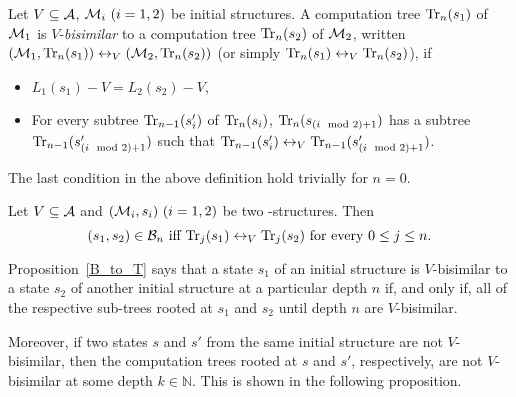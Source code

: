 \documentclass{article}
\begin{document}
Let $V\subseteq\cal A$, ${\cal M}_i~(i=1,2)$ be  initial  structures.
A computation tree $\textrm{Tr}_n(s_1)$ of ${\cal M}_1$ is $V$-{\em bisimilar}
to a computation tree $\textrm{Tr}_n(s_2)$ of ${\cal M}_2$, written
$({\cal M}_1,\textrm{Tr}_n(s_1))\leftrightarrow_V({\cal M}_2,\textrm{Tr}_n(s_2))$ (or simply
$\textrm{Tr}_n(s_1)\leftrightarrow_V\textrm{Tr}_n(s_2)$), if %
\begin{itemize}
  \item $L_1(s_1)- V=L_2(s_2)- V$,
  \item For every subtree $\textrm{Tr}_{n-1}(s_i')$ of $\textrm{Tr}_n(s_i)$,
  $\textrm{Tr}_n(s_{(i \mod 2)+1})$ has a subtree $\textrm{Tr}_{n-1}(s_{(i \mod 2)+1}')$ such that
  $\textrm{Tr}_{n-1}(s_i')\leftrightarrow_V\textrm{Tr}_{n-1}(s_{(i \mod 2)+1}')$.
\end{itemize}
The last condition in the above definition
hold trivially for $n=0$.

\begin{proposition}\label{B_to_T}
  Let $V\subseteq\cal A$ and $({\cal M}_i,s_i)~(i=1,2)$ be two \MPK-structures.
  Then
  \[(s_1,s_2)\in{\cal B}_n\mbox{ iff }
  \textrm{Tr}_j(s_1)\leftrightarrow_V\textrm{Tr}_j(s_2)\mbox{ for every $0\le j\le n$}.\]
\end{proposition}

Proposition~\ref{B_to_T} says that a state $s_1$ of an initial structure is $V$-bisimilar to a state $s_2$ of another initial structure at a particular depth $n$ if, and only if,  all of the respective sub-trees rooted at $s_1$ and $s_2$ until depth $n$ are $V$-bisimilar.


Moreover, if two states $s$ and $s'$ from the same initial structure are not $V$-bisimilar, then the computation trees rooted at $s$ and $s'$, respectively, are not $V$-bisimilar at some depth  $k\in \mathbb{N}$. This is shown in the following proposition.
\end{document}
